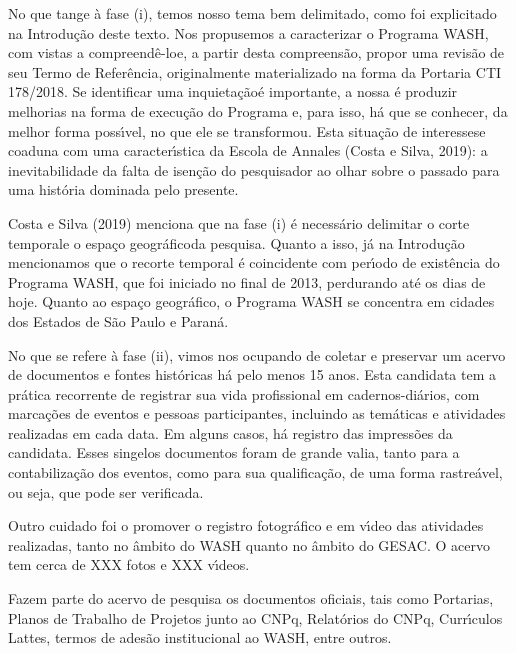 \documentclass[
12pt,		%
openright,	%
twoside,  %
a4paper,			%
chapter=TITLE,		%
english,			%
french,				%
spanish,			%
brazil				%
]{USPSC-classe/USPSC}
\begin{document}
No que tange \`a fase (i), temos nosso tema bem delimitado, como foi explicitado na Introdu\c{c}\~ao deste texto. Nos propusemos a caracterizar o Programa WASH, com vistas a \textquotedbl compreend\^e-lo\textquotedbl  e, a partir desta compreens\~ao, propor uma revis\~ao de seu Termo de Refer\^encia, originalmente materializado na forma da Portaria CTI 178/2018. Se \textquotedbl identificar uma inquieta\c{c}\~ao\textquotedbl  \'e importante, a nossa \'e produzir melhorias na forma de execu\c{c}\~ao do Programa e, para isso, h\'a que se conhecer, da melhor forma poss\'{\i}vel, no que ele se transformou. Esta situa\c{c}\~ao de \textquotedbl interesse\textquotedbl  se coaduna com uma caracter\'{\i}stica da Escola de Annales  (Costa e Silva, 2019): \textquotedbl a inevitabilidade da falta de isen\c{c}\~ao do pesquisador ao olhar sobre o passado para uma hist\'oria dominada pelo presente\textquotedbl .




Costa e Silva (2019) menciona que na fase (i) \'e necess\'ario delimitar o \textquotedbl corte temporal\textquotedbl  e o \textquotedbl espa\c{c}o geogr\'afico\textquotedbl  da pesquisa.  Quanto a isso, j\'a na Introdu\c{c}\~ao mencionamos que o recorte temporal \'e coincidente com per\'{\i}odo de exist\^encia do Programa WASH, que foi iniciado no final de 2013, perdurando at\'e os dias de hoje. Quanto ao espa\c{c}o geogr\'afico, o Programa WASH se concentra em cidades dos Estados de S\~ao Paulo e Paran\'a.




No que se refere \`a fase (ii), vimos nos ocupando de coletar e preservar um acervo de documentos e fontes hist\'oricas h\'a pelo menos 15 anos. Esta candidata tem a pr\'atica recorrente de registrar sua vida profissional em cadernos-di\'arios, com marca\c{c}\~oes de eventos e pessoas participantes, incluindo as tem\'aticas e atividades realizadas em cada data. Em alguns casos, h\'a registro das impress\~oes da candidata. Esses singelos documentos foram de grande valia, tanto para a contabiliza\c{c}\~ao dos eventos, como para sua qualifica\c{c}\~ao, de uma forma rastre\'avel, ou seja, que pode ser verificada.




Outro cuidado foi o promover o registro fotogr\'afico e em v\'{\i}deo das atividades realizadas, tanto no \^ambito do WASH quanto no \^ambito do GESAC. O acervo tem cerca de XXX fotos e XXX v\'{\i}deos.




Fazem parte do acervo de pesquisa os documentos oficiais, tais como Portarias, Planos de Trabalho de Projetos junto ao CNPq, Relat\'orios do CNPq, Curr\'{\i}culos Lattes, termos de ades\~ao institucional ao WASH, entre outros.
\end{document}
